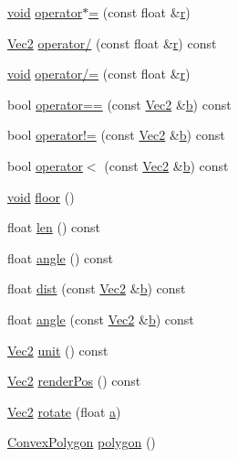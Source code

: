 \begin{DoxyCompactItemize}
\item 
\hyperlink{_s_d_l__opengles2__gl2ext_8h_ae5d8fa23ad07c48bb609509eae494c95}{void} \hyperlink{class_vec2_adaac8f78878087eb8fd9ad226e497a00}{operator$\ast$=} (const float \&\hyperlink{_s_d_l__opengl_8h_a42ce7cdc612e53abee15043f80220d97}{r})
\item 
\hyperlink{class_vec2}{Vec2} \hyperlink{class_vec2_aa372b757b60707e985ccfc669f6a8eb8}{operator/} (const float \&\hyperlink{_s_d_l__opengl_8h_a42ce7cdc612e53abee15043f80220d97}{r}) const 
\item 
\hyperlink{_s_d_l__opengles2__gl2ext_8h_ae5d8fa23ad07c48bb609509eae494c95}{void} \hyperlink{class_vec2_a5cd196e0ee673c2bef90dbc9794656d4}{operator/=} (const float \&\hyperlink{_s_d_l__opengl_8h_a42ce7cdc612e53abee15043f80220d97}{r})
\item 
bool \hyperlink{class_vec2_ac2bd601f0bf49c83e5d58248c5452443}{operator==} (const \hyperlink{class_vec2}{Vec2} \&\hyperlink{_s_d_l__opengl__glext_8h_a0f71581a41fd2264c8944126dabbd010}{b}) const 
\item 
bool \hyperlink{class_vec2_a4c68e5d5000bc0e61422fb8d7822879c}{operator!=} (const \hyperlink{class_vec2}{Vec2} \&\hyperlink{_s_d_l__opengl__glext_8h_a0f71581a41fd2264c8944126dabbd010}{b}) const 
\item 
bool \hyperlink{class_vec2_aa683eedbfa7d6c3c74f9e86e3c207470}{operator$<$} (const \hyperlink{class_vec2}{Vec2} \&\hyperlink{_s_d_l__opengl__glext_8h_a0f71581a41fd2264c8944126dabbd010}{b}) const 
\item 
\hyperlink{_s_d_l__opengles2__gl2ext_8h_ae5d8fa23ad07c48bb609509eae494c95}{void} \hyperlink{class_vec2_a983bdb8459dd3358aa97f37fb873f9f1}{floor} ()
\item 
float \hyperlink{class_vec2_a6c044492922c4b8ed2a131ece425919b}{len} () const 
\item 
float \hyperlink{class_vec2_a9d4979cfac07592169d7afbdef2fd08f}{angle} () const 
\item 
float \hyperlink{class_vec2_aeaf770c6ae4e071ae739c8590e3c9291}{dist} (const \hyperlink{class_vec2}{Vec2} \&\hyperlink{_s_d_l__opengl__glext_8h_a0f71581a41fd2264c8944126dabbd010}{b}) const 
\item 
float \hyperlink{class_vec2_a0e1c1c63b5acd89eb3afc9f9e6a54320}{angle} (const \hyperlink{class_vec2}{Vec2} \&\hyperlink{_s_d_l__opengl__glext_8h_a0f71581a41fd2264c8944126dabbd010}{b}) const 
\item 
\hyperlink{class_vec2}{Vec2} \hyperlink{class_vec2_afbee5e6bbb49afd5d5a5e29e732ebda3}{unit} () const 
\item 
\hyperlink{class_vec2}{Vec2} \hyperlink{class_vec2_a768d5e84228f54cb740697de251d1ec7}{render\-Pos} () const 
\item 
\hyperlink{class_vec2}{Vec2} \hyperlink{class_vec2_af8c61911efbcee619141d5c94394b1fd}{rotate} (float \hyperlink{_s_d_l__opengl__glext_8h_a3309789fc188587d666cda5ece79cf82}{a})
\item 
\hyperlink{class_convex_polygon}{Convex\-Polygon} \hyperlink{class_vec2_a3df96dba7f00ea8999f5b26b3eaef02b}{polygon} ()
\end{DoxyCompactItemize}
